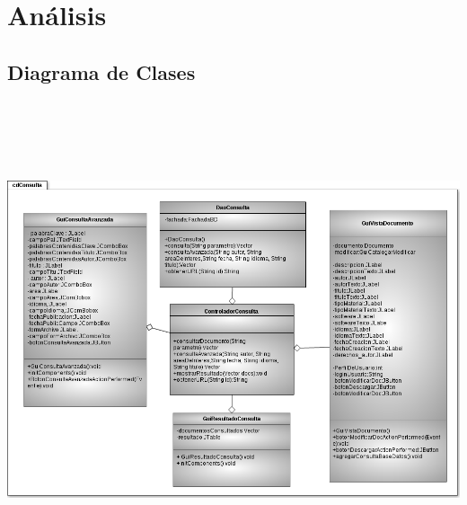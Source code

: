 \documentclass[11pt]{article}
\begin{document}
                        
                        
                        
                        
                        
                        
                        
                        
                        
                        
                        
                        
                        
                        
                        
                        
                        
                        
 
\section{Análisis}
		\subsection{Diagrama de Clases}
			\begin{minipage}[c]{1\linewidth}
				\centering
				\includegraphics[width=17cm, height=14cm]{DiagramasClase/Consultas}
			\end{minipage}	
		
\end{document}
